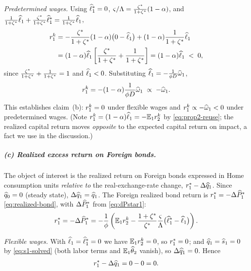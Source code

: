 \emph{Predetermined wages.} Using $\widehat{\ell}^{*}_1=0$,
$\varsigma/\Lambda=\frac{\zeta^{*}}{1+\zeta^{*}}(1-\alpha)$, and
$\frac{1}{1+\zeta^{*}}\widehat{\ell}_1+\frac{\zeta^{*}}{1+\zeta^{*}}\widehat{\ell}^{*}_1
=\frac{1}{1+\zeta^{*}}\widehat{\ell}_1$,
\begin{align}
r^{k}_1 &= -\frac{\zeta^{*}}{1+\zeta^{*}}(1-\alpha)\bigl(0-\widehat{\ell}_1\bigr)
+(1-\alpha)\frac{1}{1+\zeta^{*}}\widehat{\ell}_1 \notag\\
&= (1-\alpha)\widehat{\ell}_1\left[\frac{\zeta^{*}}{1+\zeta^{*}}+\frac{1}{1+\zeta^{*}}\right]
= (1-\alpha)\widehat{\ell}_1 \;<\;0, \label{eq:prop2b-sticky}
\end{align}
since $\frac{\zeta^{*}}{1+\zeta^{*}}+\frac{1}{1+\zeta^{*}}=1$ and $\widehat{\ell}_1<0$. Substituting
$\widehat{\ell}_1=-\frac{1}{\phi D}\widehat{\omega}_1$,
\begin{equation}
r^{k}_1 = -(1-\alpha)\frac{1}{\phi D}\widehat{\omega}_1 \;\propto\; -\widehat{\omega}_1. \label{eq:prop2b-sticky2}
\end{equation}
This establishes claim~(b): $r^{k}_1=0$ under flexible wages and
$r^{k}_1\propto-\widehat{\omega}_1<0$ under predetermined wages. (Note
$r^{k}_1=(1-\alpha)\widehat{\ell}_1=-\mathbb{E}_1r^{k}_2$ by \eqref{eq:prop2-reuse}; the
realized capital return moves \emph{opposite} to the expected capital return on
impact, a fact we use in the discussion.)

\subparagraph{(c) Realized excess return on Foreign bonds.} The object of
interest is the realized return on Foreign bonds expressed in Home consumption
units \emph{relative to} the real-exchange-rate change, $r^{*}_1-\Delta\widehat{q}_1$.
Since $\widehat{q}_0=0$ (steady state), $\Delta\widehat{q}_1=\widehat{q}_1$. The Foreign
realized bond return is $r^{*}_1=-\Delta\widehat{P}^{*}_1$ \eqref{eq:realized-bond}, with
$\Delta\widehat{P}^{*}_1$ from \eqref{eq:dPstar1}:
\begin{equation}
r^{*}_1 = -\Delta\widehat{P}^{*}_1
= -\frac{1}{\phi}\left(\mathbb{E}_1r^{k}_2-\frac{1+\zeta^{*}}{\zeta^{*}}\frac{\varsigma}{\Lambda}\bigl(\widehat{\ell}^{*}_1-\widehat{\ell}_1\bigr)\right). \label{eq:prop2c-rstar}
\end{equation}

\emph{Flexible wages.} With $\widehat{\ell}_1=\widehat{\ell}^{*}_1=0$ we have
$\mathbb{E}_1r^{k}_2=0$, so $r^{*}_1=0$; and $\widehat{q}_1=\widehat{s}_1=0$ by
\eqref{eq:s1-solved} (both labor terms and $\mathbb{E}_1\widehat{\theta}_2$ vanish), so
$\Delta\widehat{q}_1=0$. Hence
\begin{equation}
r^{*}_1-\Delta\widehat{q}_1 = 0-0 = 0. \label{eq:prop2c-flex}
\end{equation}

